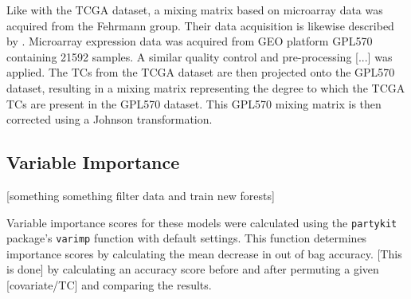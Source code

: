 Like with the TCGA dataset, a mixing matrix based on microarray data was acquired from the Fehrmann group.
Their data acquisition is likewise described by \cite{bhat:cna}.
Microarray expression data was acquired from GEO platform GPL570 containing 21592 samples.
A similar quality control and pre-processing [...] was applied.
The TCs from the TCGA dataset are then projected onto the GPL570 dataset, resulting in a mixing matrix representing the degree to which the TCGA TCs are present in the GPL570 dataset.
This GPL570 mixing matrix is then corrected using a Johnson transformation.



\subsection{Variable Importance}
[something something filter data and train new forests]

Variable importance scores for these models were calculated using the \verb|partykit| package's \verb|varimp| function with default settings.
This function determines importance scores by calculating the mean decrease in out of bag accuracy.
[This is done] by calculating an accuracy score before and after permuting a given [covariate/TC] and comparing the results.

